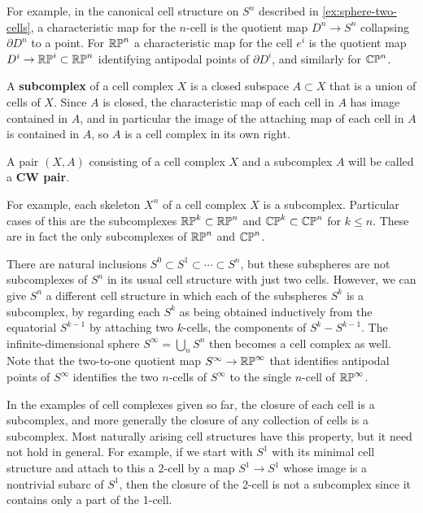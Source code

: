 For example, in the canonical cell structure on $S^n$ described in
\cref{ex:sphere-two-cells}, a characteristic map for the $n$-cell is the quotient map
$D^n \to S^n$ collapsing $\partial D^n$ to a point. For $\mathbb{RP}^n$ a characteristic map for the cell
$e^i$ is the quotient map $D^i \to \mathbb{RP}^i \subset \mathbb{RP}^n$ identifying antipodal points of
$\partial D^i$, and similarly for $\mathbb{CP}^n$.

\begin{definition}[Subcomplex]
\label{def:subcomplex}
\mathlibok
{}
A \textbf{subcomplex} of a cell complex $X$ is a closed subspace $A \subset X$ that is a
union of cells of $X$. Since $A$ is closed, the characteristic map of each cell in $A$ has
image contained in $A$, and in particular the image of the attaching map of each cell
in $A$ is contained in $A$, so $A$ is a cell complex in its own right.
\end{definition}

\begin{definition}[CW pair]
\label{def:cw-pair}
\mathlibok
{}
A pair $(X,A)$ consisting of a cell complex $X$ and a subcomplex $A$ will be
called a \textbf{CW pair}.
\end{definition}

For example, each skeleton $X^n$ of a cell complex $X$ is a subcomplex. Particular
cases of this are the subcomplexes $\mathbb{RP}^k \subset \mathbb{RP}^n$ and $\mathbb{CP}^k \subset \mathbb{CP}^n$ for $k \le n$. These
are in fact the only subcomplexes of $\mathbb{RP}^n$ and $\mathbb{CP}^n$.

There are natural inclusions $S^0 \subset S^1 \subset \cdots \subset S^n$, but these subspheres
are not subcomplexes of $S^n$ in its usual cell structure with just two cells. However, we
can give $S^n$ a different cell structure in which each of the subspheres $S^k$ is a
subcomplex, by regarding each $S^k$ as being obtained inductively from the equatorial
$S^{k-1}$ by attaching two $k$-cells, the components of $S^k - S^{k-1}$. The infinite-dimensional
sphere $S^\infty = \bigcup_n S^n$ then becomes a cell complex as well. Note that the two-to-one
quotient map $S^\infty \to \mathbb{RP}^\infty$ that identifies antipodal points of $S^\infty$ identifies the two
$n$-cells of $S^\infty$ to the single $n$-cell of $\mathbb{RP}^\infty$.

\begin{remark}
\label{rem:closure-of-cell-not-always-subcomplex}
In the examples of cell complexes given so far, the closure of each cell is a
subcomplex, and more generally the closure of any collection of cells is a subcomplex.
Most naturally arising cell structures have this property, but it need not hold in
general. For example, if we start with $S^1$ with its minimal cell structure and attach
to this a 2-cell by a map $S^1 \to S^1$ whose image is a nontrivial subarc of $S^1$, then
the closure of the 2-cell is not a subcomplex since it contains only a part of the 1-cell.
\end{remark}

